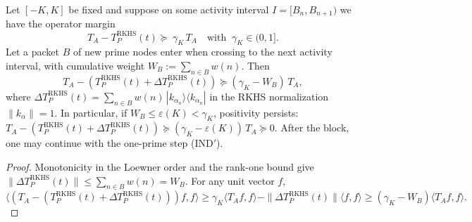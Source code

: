 \begin{theorem}\label{md:thm:IND_block}
Let $[-K,K]$ be fixed and suppose on some activity interval $I=[B_n,B_{n+1})$ we have the operator margin
\begin{equation}\label{eq:MD_2_3_base_interval-formula}
T_A-T_P^{\mathrm{RKHS}}(t) \succeq\ \gamma_K\,T_A\quad\text{with }\ \gamma_K\in(0,1].
\end{equation}
Let a packet $B$ of new prime nodes enter when crossing to the next activity interval, with cumulative weight
\(W_B:=\sum_{n\in B} w(n).\)
Then
\begin{equation}\label{eq:MD_2_3_base_interval-formula-3}
T_A-(T_P^{\mathrm{RKHS}}(t)+\Delta T_P^{\mathrm{RKHS}}(t)) \succeq (\gamma_K - W_B)\,T_A,
\end{equation}
where $\Delta T_P^{\mathrm{RKHS}}(t)=\sum_{n\in B} w(n)\,|k_{\alpha_n}\rangle\langle k_{\alpha_n}|$ in the RKHS normalization $\|k_{\alpha}\|=1$. In particular, if $W_B\le \varepsilon(K)<\gamma_K$, positivity persists:
\(T_A-(T_P^{\mathrm{RKHS}}(t)+\Delta T_P^{\mathrm{RKHS}}(t))\succeq (\gamma_K-\varepsilon(K))\,T_A \succeq 0.\)
After the block, one may continue with the one-prime step (IND$'$).
\end{theorem}
\begin{proof}
Monotonicity in the Loewner order and the rank-one bound give $\|\Delta T_P^{\mathrm{RKHS}}(t)\|\le \sum_{n\in B} w(n)=W_B$. For any unit vector $f$,
$\langle (T_A - (T_P^{\mathrm{RKHS}}(t)+\Delta T_P^{\mathrm{RKHS}}(t)))f,f\rangle \ge \gamma_K\langle T_A f,f\rangle - \|\Delta T_P^{\mathrm{RKHS}}(t)\|\langle f,f\rangle \ge (\gamma_K-W_B)\langle T_A f,f\rangle.$
\end{proof}
